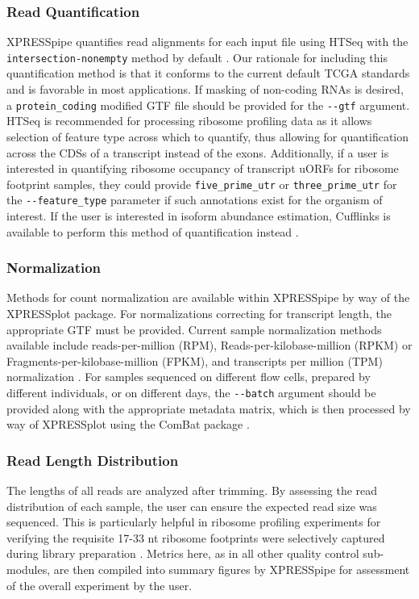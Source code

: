 \documentclass[10pt, oneside]{article}
\begin{document}
\subsubsection{Read Quantification}
XPRESSpipe quantifies read alignments for each input file using HTSeq with the \texttt{intersection-nonempty} method by default \cite{htseq, count_benchmark}. Our rationale for including this quantification method is that it conforms to the current default TCGA standards and is favorable in most applications. If masking of non-coding RNAs is desired, a \texttt{protein\_coding} modified GTF file should be provided for the \texttt{-{}-gtf} argument. HTSeq is recommended for processing ribosome profiling data as it allows selection of feature type across which to quantify, thus allowing for quantification across the CDSs of a transcript instead of the exons. Additionally, if a user is interested in quantifying ribosome occupancy of transcript uORFs for ribosome footprint samples, they could provide \texttt{five\_prime\_utr} or \texttt{three\_prime\_utr} for the \texttt{-{}-feature\_type} parameter if such annotations exist for the organism of interest. If the user is interested in isoform abundance estimation, Cufflinks is available to perform this method of quantification instead \cite{cufflinks, count_benchmark}.

\subsubsection{Normalization}
Methods for count normalization are available within XPRESSpipe by way of the XPRESSplot package. For normalizations correcting for transcript length, the appropriate GTF must be provided. Current sample normalization methods available include reads-per-million (RPM), Reads-per-kilobase-million (RPKM) or Fragments-per-kilobase-million (FPKM), and transcripts per million (TPM) normalization \cite{evans_briefbio}. For samples sequenced on different flow cells, prepared by different individuals, or on different days, the \texttt{-{}-batch} argument should be provided along with the appropriate metadata matrix, which is then processed by way of XPRESSplot using the ComBat package \cite{sva}.

\subsubsection{Read Length Distribution}
The lengths of all reads are analyzed after trimming. By assessing the read distribution of each sample, the user can ensure the expected read size was sequenced. This is particularly helpful in ribosome profiling experiments for verifying the requisite 17-33 nt ribosome footprints were selectively captured during library preparation \cite{ingolia_meth, fp_range}. Metrics here, as in all other quality control sub-modules, are then compiled into summary figures by XPRESSpipe for assessment of the overall experiment by the user.
\end{document}
